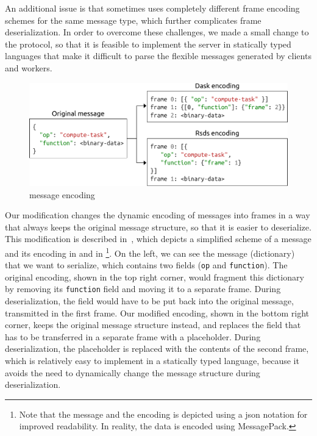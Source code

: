 An additional issue is that \dask{} sometimes uses completely different frame
encoding schemes for the same message type, which further complicates frame deserialization. In
order to overcome these challenges, we made a small change to the \dask{}
protocol, so that it is feasible to implement the server in statically typed languages that make it
difficult to parse the flexible messages generated by \dask{} clients and
workers.

\begin{figure}
	\centering
	\includegraphics[width=0.7\columnwidth]{./imgs/rsds/frame-encoding}
	\caption{\dask{} message encoding}
	\label{fig:rsds-dask-frame-encoding}
\end{figure}

Our modification changes the dynamic encoding of \dask{} messages into frames
in a way that always keeps the original message structure, so that it is easier to deserialize.
This modification is described in~, which depicts a simplified scheme of
a \dask{} message and its encoding in \dask{} and in
\rsds{}\footnote{Note that the message and the encoding is depicted using a \gls{json} notation for
improved readability. In reality, the data is encoded using MessagePack.}. On the left, we can see the message
(dictionary) that we want to serialize, which contains two fields (\texttt{op} and
\texttt{function}). The original \dask{} encoding, shown in the top
right corner, would fragment this dictionary by removing its \texttt{function} field and
moving it to a separate frame. During deserialization, the field would have to be put back into the
original message, transmitted in the first frame. Our modified encoding, shown in the bottom right
corner, keeps the original message structure instead, and replaces the field that has to be
transferred in a separate frame with a placeholder. During deserialization, the placeholder is
replaced with the contents of the second frame, which is relatively easy to implement in a
statically typed language, because it avoids the need to dynamically change the message structure
during deserialization.

